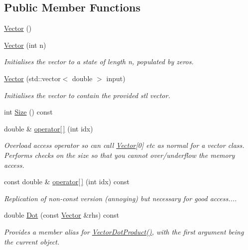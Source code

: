 \subsection*{Public Member Functions}
\begin{DoxyCompactItemize}
\item 
\hyperlink{classJSL_1_1Vector_a840fca607f8eae7dea1494b2954d3a3c}{Vector} ()
\item 
\hyperlink{classJSL_1_1Vector_aea8654ed3fb875d43f669a5f2e26fb25}{Vector} (int n)
\begin{DoxyCompactList}\small\item\em Initialises the vector to a state of length n, populated by zeros. \end{DoxyCompactList}\item 
\hyperlink{classJSL_1_1Vector_af5be93b29e1c2aab2882827d5001a2aa}{Vector} (std\+::vector$<$ double $>$ input)
\begin{DoxyCompactList}\small\item\em Initialises the vector to contain the provided stl vector. \end{DoxyCompactList}\item 
int \hyperlink{classJSL_1_1Vector_a53b26ca32061ebf41430fe2322f79c0c}{Size} () const
\item 
double \& \hyperlink{classJSL_1_1Vector_a7ff5112a7be30ca24b8ed953aaadd045}{operator\mbox{[}$\,$\mbox{]}} (int idx)
\begin{DoxyCompactList}\small\item\em Overload access operator so can call \hyperlink{classJSL_1_1Vector}{Vector}\mbox{[}0\mbox{]} etc as normal for a vector class. Performs checks on the size so that you cannot over/underflow the memory access. \end{DoxyCompactList}\item 
const double \& \hyperlink{classJSL_1_1Vector_ae461792ef0aeb62ac07c939dacedda99}{operator\mbox{[}$\,$\mbox{]}} (int idx) const
\begin{DoxyCompactList}\small\item\em Replication of non-\/const version (annoying) but necessary for good access.... \end{DoxyCompactList}\item 
double \hyperlink{classJSL_1_1Vector_a60660b5a26e0ddace46f31699834b671}{Dot} (const \hyperlink{classJSL_1_1Vector}{Vector} \&rhs) const
\begin{DoxyCompactList}\small\item\em Provides a member alias for \hyperlink{namespaceJSL_aeae64b7e0cfdc1ab5f35cca90c32d9f6}{Vector\+Dot\+Product()}, with the first argument being the current object. \end{DoxyCompactList}\item 

\end{DoxyCompactItemize}
